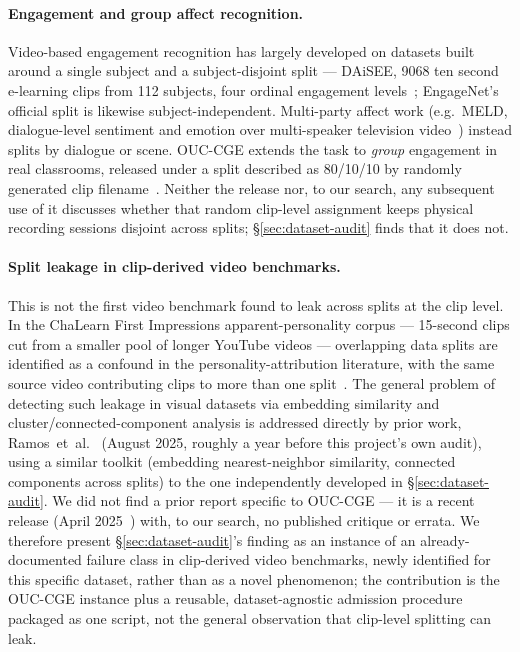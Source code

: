 \paragraph{Engagement and group affect recognition.}
Video-based engagement recognition has largely developed on datasets built
around a single subject and a subject-disjoint split --- DAiSEE, 9068 ten
second e-learning clips from 112 subjects, four ordinal engagement
levels~\cite{gupta2016daisee}; EngageNet's~\cite{singh2023engagenet}
official split is likewise
subject-independent. Multi-party affect work (e.g.\ MELD, dialogue-level
sentiment and emotion over multi-speaker television
video~\cite{poria2019meld}) instead splits by dialogue or scene. OUC-CGE
extends the task to \emph{group} engagement in real classrooms, released
under a split described as 80/10/10 by randomly generated clip
filename~\cite{lu2025ouccge}. Neither the release nor, to our search, any
subsequent use of it discusses whether that random clip-level assignment
keeps physical recording sessions disjoint across splits;
\S\ref{sec:dataset-audit} finds that it does not.

\paragraph{Split leakage in clip-derived video benchmarks.}
This is not the first video benchmark found to leak across splits at the
clip level. In the ChaLearn First Impressions apparent-personality corpus
--- 15-second clips cut from a smaller pool of longer YouTube videos ---
overlapping data splits are identified as a confound in the
personality-attribution literature, with the same source video contributing
clips to more than one split~\cite{ras2019background}. The
general problem of detecting such leakage in visual datasets via embedding
similarity and cluster/connected-component analysis is addressed directly by
prior work, Ramos~et~al.~\cite{ramos2025leakage} (August 2025, roughly a
year before this project's own audit), using a similar toolkit (embedding
nearest-neighbor similarity, connected components across splits) to the one
independently developed in \S\ref{sec:dataset-audit}. We did not find a
prior report specific to OUC-CGE --- it is a recent release
(April 2025~\cite{lu2025ouccge}) with, to our search, no published critique
or errata. We therefore present \S\ref{sec:dataset-audit}'s finding as an
instance of an already-documented failure class in clip-derived video
benchmarks, newly identified for this specific dataset, rather than as a
novel phenomenon; the contribution is the OUC-CGE instance plus a
reusable, dataset-agnostic admission procedure packaged as one script, not the general observation
that clip-level splitting can leak.

